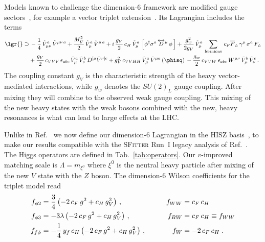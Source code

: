 Models known to challenge the dimension-6 framework are modified gauge
sectors~\cite{gauge_modifications}, for example a vector triplet
extension~\cite{anke, too_long}. Its Lagrangian includes the terms
%
\begin{alignat}{5}
\lgr{} \supset& \,
  - \dfrac{1}{4}\,\tilde{V}_{\mu\nu}^a\,\tilde{V}^{\mu\nu\, a}
  + \dfrac{M_{\tilde{V}}^2}{2}\,\tilde{V}_\mu^a\,\tilde{V}^{\mu\,a}
  + i\,\frac{g_V}{2} \,c_H\,\tilde{V}_\mu^a\,\left[\phi^\dagger \sigma^a \,\overleftrightarrow{D}^\mu\,\phi\,\right]
  +\dfrac{g_w^2}{2 g_V}\,\tilde{V}_\mu^a\,\sum_\text{fermions}\, c_F \overline{F}_L\,\gamma^\mu\, \sigma^a \,F_L
 \notag \\
 &+ \dfrac{g_V}{2}\,c_{VVV}\,\epsilon_{abc}\,\tilde{V}_\mu^a\,\tilde{V}_\nu^b\,D^{[\mu}\tilde{V}^{\nu]c}
  + g_V^2\,c_{VVHH}\,\tilde{V}_\mu^a\,\tilde{V}^{\mu a}\,(\phisq) \,
  - \dfrac{g_w}{2}\,c_{VVW}\,\epsilon_{abc}\,W^{\mu\nu}\,\tilde{V}_\mu^b\,\tilde{V}_\nu^c \,.
 \label{eq:lag-vectortriplet}
\end{alignat}
%
The coupling constant $g_V$ is the characteristic strength of the
heavy vector-mediated interactions, while $g_w$ denotes the $SU(2)_L$
gauge coupling. After mixing they will combine to the observed weak
gauge coupling. This mixing of the new heavy states with the weak
bosons combined with the new, heavy resonances is what can lead to
large effects at the LHC.

Unlike in Ref.~\cite{too_long} we now define our dimension-6
Lagrangian in the HISZ basis~\cite{hisz}, to make our results
compatible with the \textsc{SFitter} Run~I legacy analysis of
Ref.~\cite{legacy}. The Higgs operators are defined in
Tab.~\ref{tab:operators}. Our $v$-improved matching scale is
$\Lambda = m_{\xi^0}$ where $\xi^0$ is the neutral heavy particle
after mixing of the new $V$ state with the $Z$ boson. The dimension-6
Wilson coefficients for the triplet model read
%
\begin{align}
  f_{\phi 2} &= \frac 3 4 \left( -2 \,c_F \, g^2 + c_H \, g_V^2 \right) \,, \quad&\quad f_{WW} &= c_F \, c_H \notag \\
  f_{\phi 3} &= -3 \lambda \left( -2 \, c_F \,  g^2 + c_H \, g_V^2 \right) \,,  \quad&\quad f_{BW} &= c_F \, c_H \equiv f_{WW} \notag  \\
  f_{f \phi} &= - \frac 1 4 \, y_f \, c_H \left( -2 \, c_F \, g^2 + c_H \, g_V^2 \right)  \,, \quad&\quad f_W &= - 2 \, c_F \,c_H \; .
\end{align}

